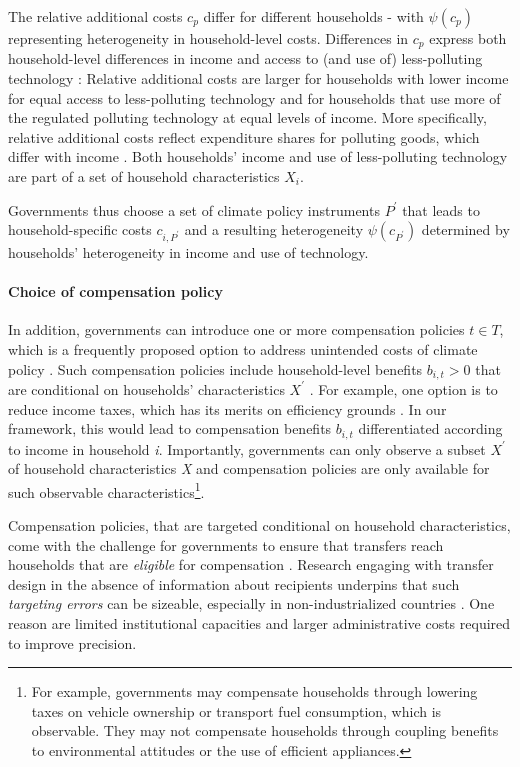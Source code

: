 \documentclass[12pt, a4paper]{article}
\begin{document}
The relative additional costs $c_{p}$ differ for different households - with $\psi(c_{p})$ representing heterogeneity in household-level costs. Differences in $c_{p}$ express both household-level differences in income and access to (and use of) less-polluting technology \autocite{Hansel.2022}: Relative additional costs are larger for households with lower income for equal access to less-polluting technology and for households that use more of the regulated polluting technology at equal levels of income. More specifically, relative additional costs reflect expenditure shares for polluting goods, which differ with income \autocite{Jacobs.2019,Dorband.2019}. Both households' income and use of less-polluting technology are part of a set of household characteristics $X_{i}$. 

Governments thus choose a set of climate policy instruments $P^{\prime}$ that leads to household-specific costs $c_{i,P^{\prime}}$ and a resulting heterogeneity $\psi(c_{P^{\prime}})$ determined by households' heterogeneity in income and use of technology.

\paragraph{Choice of compensation policy}
In addition, governments can introduce one or more compensation policies $t \in T$, which is a frequently proposed option to address unintended costs of climate policy \autocite{Klenert.2018,Baranzini.2017}. Such compensation policies include household-level benefits $b_{i,t}>0$ that are conditional on households' characteristics $X^{\prime}$ \autocite[e.g.,][]{Akerlof.1978}. For example, one option is to reduce income taxes, which has its merits on efficiency grounds \autocite{Pearce.1991,Goulder.1995,Bento.2018}. In our framework, this would lead to compensation benefits $b_{i,t}$ differentiated according to income in household \textit{i}. Importantly, governments can only observe a subset $X^{\prime}$ of household characteristics \textit{X} and compensation policies are only available for such observable characteristics\footnote{For example, governments may compensate households through lowering taxes on vehicle ownership or transport fuel consumption, which is observable. They may not compensate households through coupling benefits to environmental attitudes or the use of efficient appliances.}. 

Compensation policies, that are targeted conditional on household characteristics, come with the challenge for governments to ensure that transfers reach households that are \textit{eligible} for compensation \autocite[e.g.,][]{Hanna.2018}. Research engaging with transfer design in the absence of information about recipients underpins that such \textit{targeting errors} can be sizeable, especially in non-industrialized countries \autocite{WorldBank.2018, Robles.2019}. One reason are limited institutional capacities \autocite[e.g.,][]{Besley.2009} and larger administrative costs \autocite{Coady.2004} required to improve precision.
\end{document}
